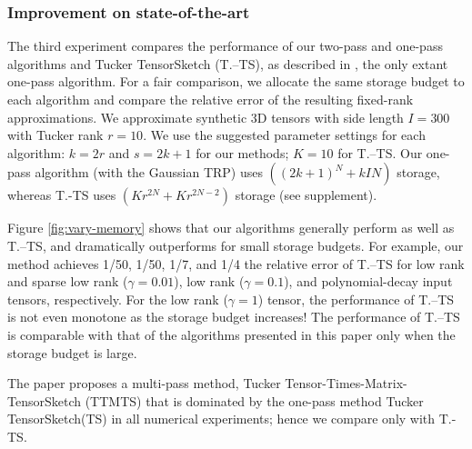 \subsubsection{Improvement on state-of-the-art}
The third experiment compares the performance of our two-pass and one-pass algorithms
and Tucker TensorSketch (T.--TS), as described in \cite{malik2018low},
the only extant one-pass algorithm.
For a fair comparison, we allocate the same storage budget to each algorithm
and compare the relative error of the resulting fixed-rank approximations.
We approximate synthetic 3D tensors with side length $I = 300$
with Tucker rank $r = 10$.
We use the suggested parameter settings for each algorithm:
$k = 2r$ and $s =2k+1$ for our methods; $K = 10$ for T.--TS.
Our one-pass algorithm
(with the Gaussian TRP)
uses $((2k+1)^N + kIN)$ storage,
whereas T.-TS uses $(Kr^{2N}+Kr^{2N-2})$ storage
(see supplement).



Figure \ref{fig:vary-memory} shows that our algorithms generally perform as well as T.--TS,
and dramatically outperforms for small storage budgets.
For example, our method achieves 1/50, 1/50, 1/7, and 1/4 the relative error of T.--TS
for low rank and sparse low rank ($\gamma = 0.01$), low rank ($\gamma = 0.1$), and polynomial-decay
input tensors, respectively.
For the low rank ($\gamma = 1$) tensor, the performance of T.--TS is not even monotone as the storage budget increases!
The performance of T.--TS is comparable with that of
the algorithms presented in this paper only when the storage budget is large.

\begin{remark}
	The paper \cite{malik2018low} proposes a multi-pass method, Tucker Tensor-Times-Matrix-TensorSketch (TTMTS) that is dominated by the one-pass method Tucker TensorSketch(TS) in all numerical experiments;
  hence we compare only with T.-TS.
\end{remark}

